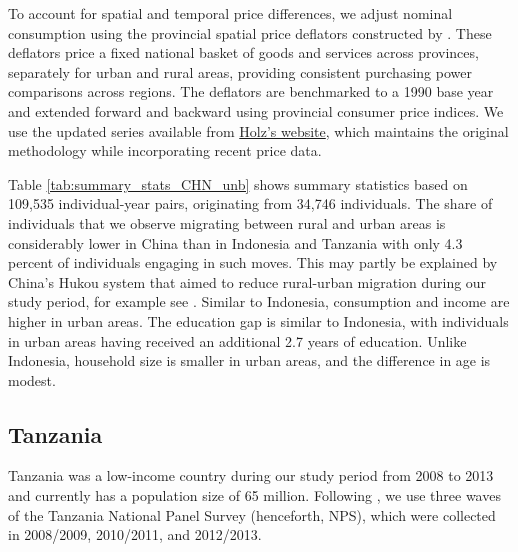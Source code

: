 \documentclass[12pt]{article}
\begin{document}
To account for spatial and temporal price differences, we adjust nominal consumption using the provincial spatial price deflators constructed by \citet{brandt2006spatial}. 
These deflators price a fixed national basket of goods and services across provinces, separately for urban and rural areas, providing consistent purchasing power comparisons across regions. 
The deflators are benchmarked to a 1990 base year and extended forward and backward using provincial consumer price indices. 
We use the updated series available from \href{https://carstenholz.people.ust.hk/SpatialDeflators.html}{Holz's website}, which maintains the original methodology while incorporating recent price data.




Table \ref{tab:summary_stats_CHN_unb} shows summary statistics based on 109,535 individual-year pairs, originating from 34,746 individuals. The share of individuals that we observe migrating between rural and urban areas is considerably lower in China than in Indonesia and Tanzania with only 4.3 percent of individuals engaging in such moves. This may partly be explained by China's Hukou system that aimed to reduce rural-urban migration during our study period, for example see \cite{khanna2021productivity}.
Similar to Indonesia, consumption and income are higher in urban areas. The education gap is similar to Indonesia, with individuals in urban areas having received an additional 2.7 years of education. Unlike Indonesia, household size is smaller in urban areas, and the difference in age is modest.



\subsection{Tanzania}\label{subsec:Tanzania-data}
Tanzania was a low-income country during our study period from 2008 to 2013 and currently has a population size of 65 million. Following \cite{lagakosMigrationCostsObservational2020}, we use three waves of the Tanzania National Panel Survey (henceforth, NPS), which were collected in 2008/2009, 2010/2011, and 2012/2013. 
\end{document}
